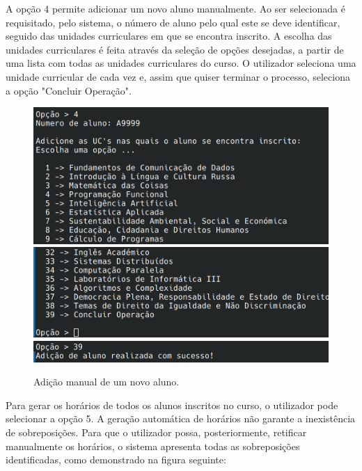 \documentclass[12pt, a4paper]{article}
\begin{document}
A opção 4 permite adicionar um novo aluno manualmente. Ao ser selecionada é requisitado, pelo
sistema, o número de aluno pelo qual este se deve identificar, seguido das unidades curriculares em
que se encontra inscrito. A escolha das unidades curriculares é feita através da seleção de opções
desejadas, a partir de uma lista com todas as unidades curriculares do curso. O utilizador seleciona
uma unidade curricular de cada vez e, assim que quiser terminar o processo, seleciona a opção
"Concluir Operação". \\

\begin{figure}[H]
    \centering
    \includegraphics[width=\textwidth]{Imagens/Manual/DiretorCurso-4-1.png}
    \includegraphics[width=\textwidth]{Imagens/Manual/DiretorCurso-4-2.png}
    \includegraphics[width=\textwidth]{Imagens/Manual/DiretorCurso-4-3.png}
    \caption{Adição manual de um novo aluno.}
\end{figure}

Para gerar os horários de todos os alunos inscritos no curso, o utilizador pode selecionar a opção
5. A geração automática de horários não garante a inexistência de sobreposições. Para que o
utilizador possa, posteriormente, retificar manualmente os horários, o sistema apresenta todas as
sobreposições identificadas, como demonstrado na figura seguinte: \\
\end{document}

